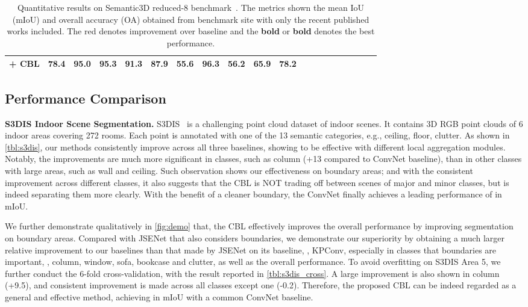 \documentclass[10pt,twocolumn,letterpaper]{article}
\begin{document}
\begin{table*}
\begin{center}
{\begin{tabular}{r |cc|ccccccccccccccccc }
\textbf{ + CBL} & \textbf{\color{red} 78.4} & \textbf{\color{red} 95.0} & 95.3   & 91.3   & {\color{red} 87.9}   & \textbf{\color{red} 55.6}   & \textbf{\color{red} 96.3}   & \textbf{\color{red} 56.2}   & 65.9   & {\color{red}78.2} \\
\hline
\end{tabular}
}\end{center}
\caption{Quantitative results on Semantic3D reduced-8 benchmark~\cite{semantic3d}. The metrics shown the mean IoU (mIoU) and overall accuracy (OA) obtained from benchmark site with only the recent published works included. The {\color{red}red} denotes improvement over baseline and the \textbf{bold} or \textbf{\color{red}bold} denotes the best performance.}
\label{tbl:semantic3d}
\end{table*}


\subsection{Performance Comparison}
\noindent\textbf{S3DIS Indoor Scene Segmentation.}
S3DIS~\cite{s3dis} is a challenging point cloud dataset of indoor scenes. It contains 3D RGB point clouds of 6 indoor areas covering 272 rooms. Each point is annotated with one of the 13 semantic categories, e.g., ceiling, floor, clutter.
As shown in \cref{tbl:s3dis}, our methods consistently improve across all three baselines, showing to be effective with different local aggregation modules.
Notably, the improvements are much more significant in classes, such as column (+13 compared to ConvNet baseline), than in other classes with large areas, such as wall and ceiling. Such observation shows our effectiveness on boundary areas; and with the consistent improvement across different classes, it also suggests that the CBL is NOT trading off between scenes of major and minor classes, but is indeed separating them more clearly. With the benefit of a cleaner boundary, the ConvNet finally achieves a leading performance of  in mIoU.

We further demonstrate qualitatively in \cref{fig:demo} that, the CBL effectively improves the overall performance by improving segmentation on boundary areas.
Compared with JSENet\cite{bound_3d_jse} that also considers boundaries, we demonstrate our superiority by obtaining a much larger relative improvement to our baselines than that made by JSENet on its baseline, \ie, KPConv\cite{kpconv}, especially in classes that boundaries are important, \eg, column, window, sofa, bookcase and clutter, as well as the overall performance.
To avoid overfitting on S3DIS Area 5, we further conduct the 6-fold cross-validation, with the result reported in \cref{tbl:s3dis_cross}. A large improvement is also shown in column (+9.5), and consistent improvement is made across all classes except one (-0.2). Therefore, the proposed CBL can be indeed regarded as a general and effective method, achieving  in mIoU with a common ConvNet baseline.
\end{document}
